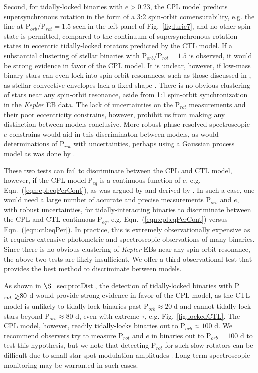 \documentclass[twocolumn]{aastex61}
\def\gsim{~\rlap{$>$}{\lower 1.0ex\hbox{$\sim$}}}
\newcommand{\kepler}[0]{\textit{Kepler}\xspace}
\begin{document}
Second, for tidally-locked binaries with $e > 0.23$, the CPL model predicts supersynchronous rotation in the form of a 3:2 spin-orbit comensurability, e.g. the line at P$_{orb}/$P$_{rot} = 1.5$ seen in the left panel of Fig.~\ref{fig:lurie7}, and no other spin state is permitted, compared to the continuum of supersynchronous rotation states in eccentric tidally-locked rotators predicted by the CTL model. If a substantial clustering of stellar binaries with P$_{orb}/$P$_{rot} = 1.5$ is observed, it would be strong evidence in favor of the CPL model. It is unclear, however, if low-mass binary stars can even lock into spin-orbit resonances, such as those discussed in \citet{Rodriguez2012}, as stellar convective envelopes lack a fixed shape \citep{Burkart2014,Lurie2017}.  There is no obvious clustering of stars near any spin-orbit resonance, aside from 1:1 spin-orbit synchronization in the \citet{Lurie2017} \kepler EB data. The lack of uncertainties on the \citet{Lurie2017} P$_{rot}$ measurements and their poor eccentricity constrains, however, prohibit us from making any distinction between models conclusive.  More robust phase-resolved spectroscopic $e$ constrains would aid in this discriminaton between models, as would determinations of P$_{rot}$ with uncertainties, perhaps using a Gaussian process model as was done by \citet{Angus2018}.  

These two tests can fail to discriminate between the CPL and CTL model, however, if the CPL model P$_{eq}$ is a continuous function of $e$, e.g. Eqn.~(\ref{eqn:cpl:eqPerCont}), as was argued by \citet{Goldreich1966b} and derived by \citet{Murray1999}.  In such a case, one would need a large number of accurate and precise measurements P$_{orb}$ and $e$, with robust uncertainties, for tidally-interacting binaries to discriminate between the CPL and CTL continuous P$_{eq}$, e.g. Eqn.~(\ref{eqn:cpl:eqPerCont}) versus Eqn.~(\ref{eqn:ctl:eqPer}).  In practice, this is extremely observationally expensive as it requires extensive photometric and spectroscopic observations of many binaries. Since there is no obvious clustering of \kepler EBs near any spin-orbit resonance, the above two tests are likely insufficient. We offer a third observational test that provides the best method to discriminate between models.

As shown in $\S$~\ref{sec:protDist}, the detection of tidally-locked binaries with P$_{rot} \gsim 80$ d would provide strong evidence in favor of the CPL model, as the CTL model is unlikely to tidally-lock binaries past P$_{orb} \approx 20$ d and cannot tidally-lock stars beyond P$_{orb} \approx 80$ d, even with extreme $\tau$, e.g. Fig.~\ref{fig:lockedCTL}. The CPL model, however, readily tidally-locks binaries out to P$_{orb} \approx 100$ d.  We recommend observers try to measure P$_{rot}$ and $e$ in binaries out to P$_{orb} = 100$ d to test this hypothesis, but we note that detecting P$_{rot}$ for such slow rotators can be difficult due to small star spot modulation amplitudes \citep{McQuillan2014,Lurie2017,Reinhold2018}. Long term spectroscopic monitoring may be warranted in such cases.
\end{document}
